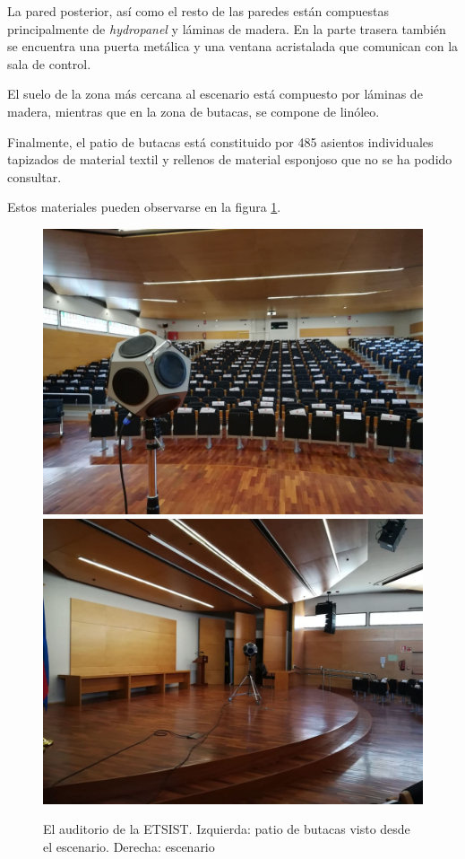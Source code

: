 \documentclass[11pt,a4paper,twoside]{book}
\begin{document}
 			La pared posterior, así como el resto de las paredes están compuestas principalmente de \textit{hydropanel} y láminas de madera. En la parte trasera también se encuentra una puerta metálica y una ventana acristalada que comunican con la sala de control.
 
 			El suelo de la zona más cercana al escenario está compuesto por láminas de madera, mientras que en la zona de butacas, se compone de linóleo.
 			
 			Finalmente, el patio de butacas está constituido por 485 asientos individuales tapizados de material textil y rellenos de material esponjoso que no se ha podido consultar.
 
 			Estos materiales pueden observarse en la figura \ref{fig:materiales}.
 
 			\begin{figure}
 				\includegraphics[scale=.25]{../imagenes/fuente.jpg}%
 				\includegraphics[scale=.25]{../imagenes/fuente2.jpg} 
 				\centering
 				\caption{El auditorio de la ETSIST. Izquierda: patio de butacas visto desde el escenario. Derecha: escenario}
 				\label{fig:materiales}

 			\end{figure}
 
\end{document}
